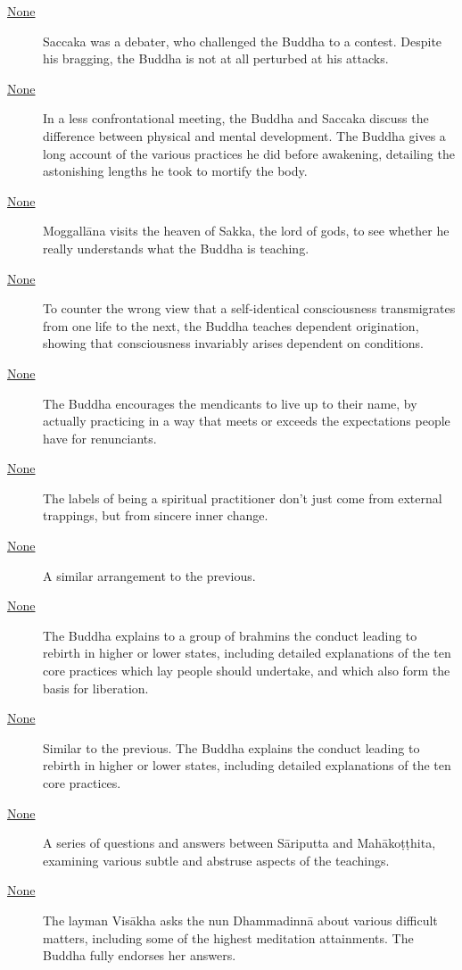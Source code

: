 \documentclass[12pt,openany]{book}%
\begin{document}
\begin{description}
\item[\href{\#mn35}{None}] Saccaka was a debater, who challenged the Buddha to a contest. Despite his bragging, the Buddha is not at all perturbed at his attacks.%
\item[\href{\#mn36}{None}] In a less confrontational meeting, the Buddha and Saccaka discuss the difference between physical and mental development. The Buddha gives a long account of the various practices he did before awakening, detailing the astonishing lengths he took to mortify the body.%
\item[\href{\#mn37}{None}] \textsanskrit{Moggallāna} visits the heaven of Sakka, the lord of gods, to see whether he really understands what the Buddha is teaching.%
\item[\href{\#mn38}{None}] To counter the wrong view that a self-identical consciousness transmigrates from one life to the next, the Buddha teaches dependent origination, showing that consciousness invariably arises dependent on conditions.%
\item[\href{\#mn39}{None}] The Buddha encourages the mendicants to live up to their name, by actually practicing in a way that meets or exceeds the expectations people have for renunciants.%
\item[\href{\#mn40}{None}] The labels of being a spiritual practitioner don’t just come from external trappings, but from sincere inner change.%
\item[\href{\#mn{-}culayamakavagga}{None}] A similar arrangement to the previous.%
\item[\href{\#mn41}{None}] The Buddha explains to a group of brahmins the conduct leading to rebirth in higher or lower states, including detailed explanations of the ten core practices which lay people should undertake, and which also form the basis for liberation.%
\item[\href{\#mn42}{None}] Similar to the previous. The Buddha explains the conduct leading to rebirth in higher or lower states, including detailed explanations of the ten core practices.%
\item[\href{\#mn43}{None}] A series of questions and answers between \textsanskrit{Sāriputta} and \textsanskrit{Mahākoṭṭhita}, examining various subtle and abstruse aspects of the teachings.%
\item[\href{\#mn44}{None}] The layman \textsanskrit{Visākha} asks the nun \textsanskrit{Dhammadinnā} about various difficult matters, including some of the highest meditation attainments. The Buddha fully endorses her answers.%

\end{description}
\end{document}
